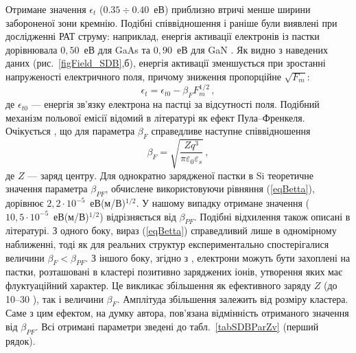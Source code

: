 Отримане значення $\epsilon_t$ ($0.35\div0.40$~еВ) приблизно втричі менше ширини забороненої зони кремнію.
Подібні співвідношення і раніше були виявлені при дослідженні РАТ струму:
наприклад, енергія активації електронів із пастки дорівнювала $0,50$~еВ для GaAs \cite{Pipinys1999} та $0,90$~еВ для GaN \cite{Pipinys2006}.
Як видно з наведених даних (рис.~\ref{figField_SDB},б),
енергія активації зменшується при зростанні напруженості електричного поля,
причому зниження пропорційне $\sqrt{F_m}$:
\begin{equation}\label{eqEtE}
    \epsilon_t=\epsilon_{t0}-\beta_F F_m^{1/2}\,,
\end{equation}
де
$\epsilon_{t0}$ --- енергія зв'язку електрона на пастці за відсутності поля.
Подібний механізм польової емісії відомий в літературі як ефект Пула--Френкеля.
Очікується \cite{PF:Mitrofanov,PF:ZhdanovaR}, що для параметра $\beta_F$ справедливе наступне співвідношення
\begin{equation}\label{eqBetta}
    \beta_F=\sqrt{\frac{Zq^3}{\pi\varepsilon_0\varepsilon_s}}\,,
\end{equation}
де
$Z$ --- заряд центру.
Для однократно зарядженої пастки в Si теоретичне значення параметра $\beta_{PF}$, обчислене використовуючи
рівняння (\ref{eqBetta}), дорівнює $2,2\cdot10^{-5}$~еВ(м/В)$^{1/2}$.
У нашому випадку отримане значення ($10,5\cdot10^{-5}$~еВ(м/В)$^{1/2}$) відрізняється від $\beta_{PF}$.
Подібні відхилення також описані в літературі.
З одного боку, вираз (\ref{eqBetta}) справедливий лише в одномірному наближенні, тоді як для реальних структур
експериментально  спостерігалися \cite{PF:Mitrofanov,PF:ZhdanovaR} величини $\beta_F<\beta_{PF}$.
З іншого боку, згідно з \cite{PF:ZhdanovaR}, електрони можуть бути захоплені на пастки, розташовані в кластері позитивно заряджених іонів, утворення яких має флуктуаційний характер.
Це викликає збільшення як ефективного  заряду $Z$ (до 10--30 \cite{PF:ZhdanovaR}), так і величини $\beta_F$.
Амплітуда збільшення залежить від розміру кластера.
Саме з цим ефектом, на думку автора, пов'язана відмінність отриманого значення від $\beta_{PF}$.
Всі отримані параметри зведені до табл.~\ref{tabSDBParZv} (перший рядок).




